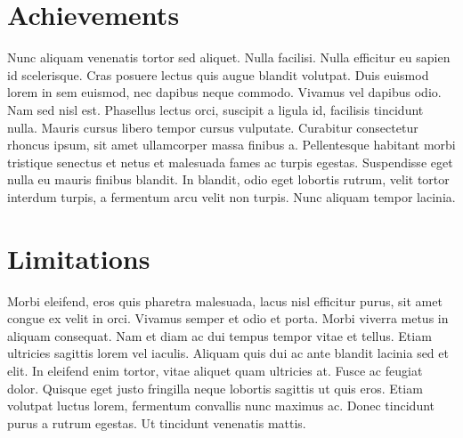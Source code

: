 \label{ch:conclusions}

\section{Achievements}
Nunc aliquam venenatis tortor sed aliquet. Nulla facilisi. Nulla efficitur eu sapien id scelerisque. Cras posuere lectus quis augue blandit volutpat. Duis euismod lorem in sem euismod, nec dapibus neque commodo. Vivamus vel dapibus odio. Nam sed nisl est. Phasellus lectus orci, suscipit a ligula id, facilisis tincidunt nulla. Mauris cursus libero tempor cursus vulputate. Curabitur consectetur rhoncus ipsum, sit amet ullamcorper massa finibus a. Pellentesque habitant morbi tristique senectus et netus et malesuada fames ac turpis egestas. Suspendisse eget nulla eu mauris finibus blandit. In blandit, odio eget lobortis rutrum, velit tortor interdum turpis, a fermentum arcu velit non turpis. Nunc aliquam tempor lacinia.

\section{Limitations}
Morbi eleifend, eros quis pharetra malesuada, lacus nisl efficitur purus, sit amet congue ex velit in orci. Vivamus semper et odio et porta. Morbi viverra metus in aliquam consequat. Nam et diam ac dui tempus tempor vitae et tellus. Etiam ultricies sagittis lorem vel iaculis. Aliquam quis dui ac ante blandit lacinia sed et elit. In eleifend enim tortor, vitae aliquet quam ultricies at. Fusce ac feugiat dolor. Quisque eget justo fringilla neque lobortis sagittis ut quis eros. Etiam volutpat luctus lorem, fermentum convallis nunc maximus ac. Donec tincidunt purus a rutrum egestas. Ut tincidunt venenatis mattis.
